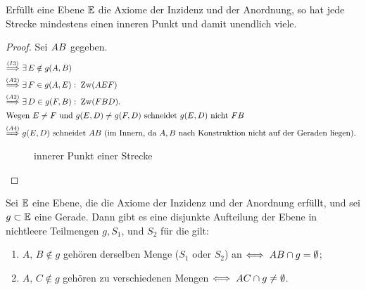 \begin{thm}
    Erfüllt eine Ebene $\mathbb E$ die Axiome der Inzidenz und der Anordnung, so hat jede Strecke
    mindestens einen inneren Punkt und damit unendlich viele.
\end{thm}

\begin{proof}
    Sei ${AB}$ gegeben.
    \begin{align*}
        \stackrel{(I3)}{\Longrightarrow}\ & \exists\,E\notin g(A,B)\\
        \stackrel{(A2)}{\Longrightarrow}\ & \exists\,F\in g(A,E):\;\operatorname{Zw}(AEF)\\
        \stackrel{(A2)}{\Longrightarrow}\ & \exists\,D\in g(F,B):\;\operatorname{Zw}(FBD).\\
        \intertext{Wegen $E\neq F$ und $g(E,D)\neq g(F,D)$ schneidet $g(E,D)$ nicht ${FB}$}
        \stackrel{(A4)}{\Longrightarrow}\ & g(E,D) \text{ schneidet } {AB} \text{ (im Innern, da
        $A,B$ nach Konstruktion nicht auf der Geraden liegen). }
    \end{align*}

    \begin{figure}[ht]
        
        \caption{innerer Punkt einer Strecke}
    \end{figure}
\end{proof}


\begin{thm}\label{thm:satz.s1a}
    Sei $\mathbb E$ eine Ebene, die die Axiome der Inzidenz und der Anordnung erfüllt, und sei $g \subset
    \mathbb E$ eine Gerade. Dann gibt es eine disjunkte Aufteilung der Ebene in nichtleere Teilmengen $g,
    S_1$, und $S_2$ für die gilt:

    \renewcommand{\labelenumi}{\alph{enumi})} %
    \begin{enumerate}
        \item $A,\, B \notin g$ gehören derselben Menge ($S_1$ oder $S_2$) an
            $\Longleftrightarrow\; {AB} \cap g = \emptyset$;

        \item $A,\, C \notin g$ gehören zu verschiedenen Mengen $\Longleftrightarrow\;
            {AC} \cap g \neq \emptyset$.
    \end{enumerate}
\end{thm}

